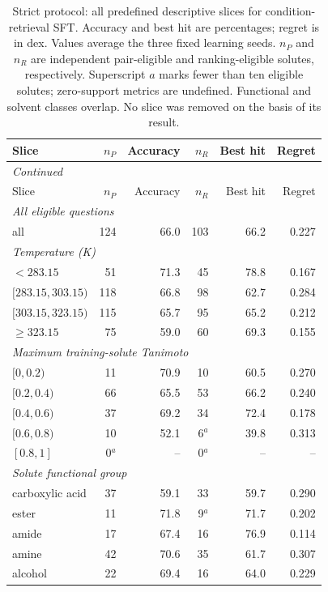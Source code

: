 \begingroup\footnotesize
\setlength{\tabcolsep}{3pt}
\begin{longtable}{lrrrrr}
\caption{Strict protocol: all predefined descriptive slices for condition-retrieval SFT. Accuracy and best hit are percentages; regret is in dex. Values average the three fixed learning seeds. $n_P$ and $n_R$ are independent pair-eligible and ranking-eligible solutes, respectively. Superscript $a$ marks fewer than ten eligible solutes; zero-support metrics are undefined. Functional and solvent classes overlap. No slice was removed on the basis of its result.}\label{tab:si-slices-strict}\\
\toprule
Slice & $n_P$ & Accuracy & $n_R$ & Best hit & Regret \\
\midrule
\endfirsthead
\multicolumn{6}{l}{\textit{Continued}} \\
\toprule
Slice & $n_P$ & Accuracy & $n_R$ & Best hit & Regret \\
\midrule
\endhead
\multicolumn{6}{l}{\textit{All eligible questions}} \\
all & 124 & 66.0 & 103 & 66.2 & 0.227 \\
\multicolumn{6}{l}{\textit{Temperature (K)}} \\
$<283.15$ & 51 & 71.3 & 45 & 78.8 & 0.167 \\
$[283.15,303.15)$ & 118 & 66.8 & 98 & 62.7 & 0.284 \\
$[303.15,323.15)$ & 115 & 65.7 & 95 & 65.2 & 0.212 \\
$\geq 323.15$ & 75 & 59.0 & 60 & 69.3 & 0.155 \\
\multicolumn{6}{l}{\textit{Maximum training-solute Tanimoto}} \\
$[0,0.2)$ & 11 & 70.9 & 10 & 60.5 & 0.270 \\
$[0.2,0.4)$ & 66 & 65.5 & 53 & 66.2 & 0.240 \\
$[0.4,0.6)$ & 37 & 69.2 & 34 & 72.4 & 0.178 \\
$[0.6,0.8)$ & 10 & 52.1 & 6$^{a}$ & 39.8 & 0.313 \\
$[0.8,1]$ & 0$^{a}$ & -- & 0$^{a}$ & -- & -- \\
\multicolumn{6}{l}{\textit{Solute functional group}} \\
carboxylic acid & 37 & 59.1 & 33 & 59.7 & 0.290 \\
ester & 11 & 71.8 & 9$^{a}$ & 71.7 & 0.202 \\
amide & 17 & 67.4 & 16 & 76.9 & 0.114 \\
amine & 42 & 70.6 & 35 & 61.7 & 0.307 \\
alcohol & 22 & 69.4 & 16 & 64.0 & 0.229 \\

\end{longtable}

